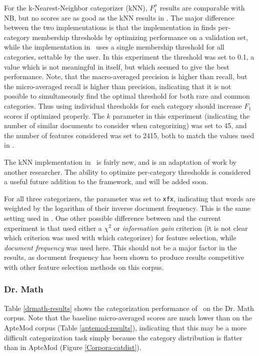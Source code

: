 For the k-Nearest-Neighbor categorizer (kNN), $F_1^\mu$ results are comparable
with NB, but no scores are as good as the kNN results in \cite{yang:99}.
The major difference between the two implementations is that the
implementation in \cite{yang:99} finds per-category membership
thresholds by optimizing performance on a validation set, while the
implementation in \aicat\ uses a single membership threshold for all
categories, settable by the user.  In this experiment the threshold
was set to 0.1, a value which is not meaningful in itself, but which
seemed to give the best performance.  Note, that the macro-averaged
precision is higher than recall, but the micro-averaged recall is
higher than precision, indicating that it is not possible to
simultaneously find the optimal threshold for both rare and common
categories.  Thus using individual thresholds for each category should
increase $F_1$ scores if optimized properly.  The $k$ parameter
in this experiment
(indicating the number of similar documents to consider when
categorizing) was set to 45, and the number of features considered was
set to 2415, both to match the values used in \cite{yang:99}.

The kNN implementation in \aicat\ is fairly new, and is an adaptation
of work by another researcher.  The ability to optimize per-category
thresholds is considered a useful future addition to the framework,
and will be added soon.

For all three categorizers, the  parameter was set to
\texttt{xfx}, indicating that words are weighted by the logarithm of
their inverse document frequency.  This is the same setting used in
\cite{yang:99}.  One other possible difference between \cite{yang:99}
and the current experiment is that \cite{yang:99} used either a
$\chi^2$ or \emph{information gain} criterion (it is not clear which
criterion was used with which categorizer) for feature selection,
while \emph{document frequency} was used here.  This should not be a
major factor in the results, as document frequency has been shown to
produce results competitive with other feature selection methods on
this corpus. \cite{yang:97}



\subsubsection{Dr. Math}

Table \ref{drmath-results} shows the categorization performance of
\aicat\ on the Dr. Math corpus.  Note that the baseline micro-averaged
scores are much lower than on the ApteMod corpus (Table
\ref{aptemod-results}), indicating that this may be a more difficult
categorization task simply because the category distribution is
flatter than in ApteMod (Figure \ref{Corpora-catdist}).


